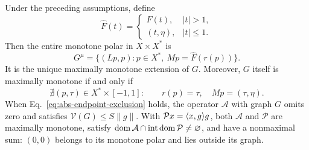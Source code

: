 \renewcommand{\thetheorem}{E}
\begin{theorem}
\label{thm:endpoint-criterion}
Under the preceding assumptions, define
\[
\widehat F(t)=
\begin{cases}
F(t),&|t|>1,\\
(t,\eta),&|t|\le1.
\end{cases}
\]
Then the entire monotone polar in $X\times X^*$ is
\begin{equation}
G^\mu=\{(Lp,p):p\in X^*,\ Mp=\widehat F(r(p))\}.
\label{eq:abs-entire-polar}
\end{equation}
It is the unique maximally monotone extension of $G$. Moreover, $G$
itself is maximally monotone if and only if
\begin{equation}
\nexists(p,\tau)\in X^*\times[-1,1]:
\qquad r(p)=\tau,\quad Mp=(\tau,\eta).
\label{eq:abs-endpoint-exclusion}
\end{equation}
When Eq.~\eqref{eq:abs-endpoint-exclusion} holds, the operator
$\mathcal A$ with graph $G$ omits zero and satisfies
$\mathcal V(G)\le S\|g\|$. With
$\mathcal P x=\langle x,g\rangle g$, both $\mathcal A$ and $\mathcal P$
are maximally monotone, satisfy
$\operatorname{dom}\mathcal A\cap\operatorname{int}\operatorname{dom}\mathcal P\ne\varnothing$,
and have a nonmaximal sum: $(0,0)$ belongs to its monotone polar
and lies outside its graph.
\end{theorem}
